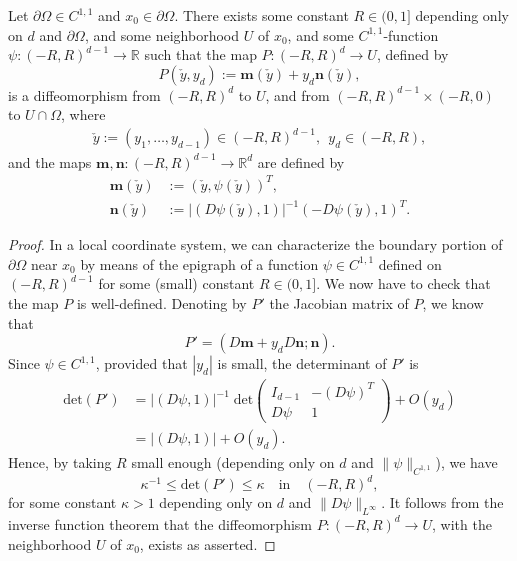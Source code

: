 \documentclass[AHL,Unicode,longabstracts,published]{cedram}
\newcommand*\p{\partial}
\renewcommand*\det{\mathrm{det}}
\newcommand*\R {\mathbb{R}}
\newcommand*\mm {\boldsymbol{m}}
\newcommand*\nn {\boldsymbol{n}}
\begin{document}
\begin{lemm}\label{flattening}
Let $\p\Omega\in C^{1,1}$ and $x_0\in\p\Omega$. There exists some constant $R\in(0,1]$ depending only on $d$ and $\p\Omega$, and some neighborhood $U$ of $x_0$, and some $C^{1,1}$-function $\psi:(-R,R)^{d-1} \rightarrow \R$ such that the map $P:(-R,R)^d\rightarrow U$, defined by
\begin{equation}\label{flatten}
P(\check{y},y_d):=\mm(\check{y})+y_d\nn(\check{y}),
\end{equation}
is a diffeomorphism from $(-R,R)^d$ to $U$, and from $(-R,R)^{d-1}\times(-R,0)$ to $U\cap\Omega$, where
\begin{align*}
\check{y}:=(y_1,\ldots,y_{d-1})\in(-R,R)^{d-1},\ \ y_d\in(-R,R),
\end{align*}
and the maps $\mm,\nn:(-R,R)^{d-1} \rightarrow \R^d$ are defined by
\begin{align*}
\mm(\check{y})&:=\left(\check{y},\psi(\check{y})\right)^T,
\\
\nn(\check{y})&:=\left|\left(D\psi(\check{y}),1\right)\right|^{-1}\left(-D\psi(\check{y}),1\right)^T.
\end{align*}
\end{lemm}

\begin{proof}
In a local coordinate system, we can characterize the boundary portion of $\partial\Omega$ near $x_0$ by means of the epigraph of a function $\psi\in C^{1,1}$ defined on $(-R,R)^{d-1}$ for some (small) constant $R\in(0,1]$. We now have to check that the map $P$ is well-defined. Denoting by $P'$ the Jacobian matrix of $P$, we know that
\begin{equation}\label{DP}
P'=\left(D\mm+y_dD\nn;\nn\right).
\end{equation}
Since $\psi\in C^{1,1}$, provided that $|y_d|$ is small, the determinant of $P'$ is
\begin{equation}\label{det}
\begin{split}
\det(P') &=\left|(D\psi,1)\right|^{-1}\;\! \det\!
\begin{pmatrix}
I_{d-1} & -(D\psi)^T \\
D\psi & 1
\end{pmatrix} +O(y_d)\\
&= |(D\psi,1)| + O(y_d).
\end{split}
\end{equation}
Hence, by taking $R$ small enough (depending only on $d$ and $\|\psi\|_{C^{1,1}}$), we have
\begin{equation}\label{detk}
\kappa^{-1}\le \det(P') \le\kappa \quad\text{in}\quad (-R,R)^{d},
\end{equation}
for some constant $\kappa>1$ depending only on $d$ and $\|D\psi\|_{L^\infty}$. It follows from the inverse function theorem that the diffeomorphism $P:(-R,R)^d\rightarrow U$, with the neighborhood $U$ of $x_0$, exists as asserted.
\end{proof}
\end{document}
